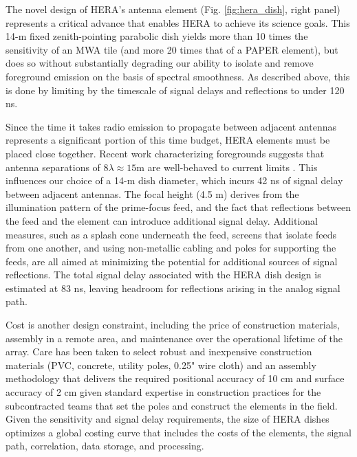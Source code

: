 \documentclass[preprint]{aastex}
\newcommand{\Mycitep}[1]{{\bf \citep{#1}}}
\begin{document}
The novel design of HERA's antenna element
(Fig. \ref{fig:hera_dish}, right panel) represents a critical advance
that enables HERA to achieve its science goals.  This 14-m
fixed zenith-pointing parabolic dish yields more than 10 times the
sensitivity of an MWA tile (and more 20 times
that of a PAPER element), but does so without substantially degrading
our ability to isolate and remove foreground emission on the basis of
spectral smoothness.  As described above, this is done by limiting by 
the timescale of signal delays and reflections to under 120 ns.

Since the time it takes radio emission to propagate between adjacent antennas 
represents a significant portion of this time budget, HERA elements must be placed close together.
Recent work characterizing foregrounds suggests that 
antenna separations of $8\lambda \approx 15$m are
well-behaved to current limits \Mycitep{pober_et_al2013,parsons_et_al2013}. This influences our
choice of a 14-m dish diameter,
which incurs 42 ns of signal delay between adjacent antennas.
The focal height (4.5 m) derives from the illumination pattern of the prime-focus
feed, and the fact that reflections
between the feed and the element%
can introduce additional signal delay. 
Additional measures, such as a splash cone underneath the feed, screens that isolate feeds from one another, and using
non-metallic cabling and poles for supporting the feeds, are all aimed at minimizing
the potential for additional sources of signal reflections.
The total signal delay associated with the HERA dish design is estimated at 83 ns, leaving
headroom for reflections arising in the analog signal path.

Cost is another design constraint, including the price of construction
materials, assembly in a remote area, and maintenance over the operational
lifetime of the array.  Care has been taken to select robust and inexpensive
construction materials (PVC, concrete, utility poles, 0.25" wire cloth) and an assembly methodology that delivers the required positional
accuracy of 10 cm and surface accuracy of 2 cm given standard expertise in construction
practices for the subcontracted teams that set the poles and construct the
elements in the field.  
Given the sensitivity and signal delay requirements, the size of HERA
dishes optimizes a global costing curve that includes the costs of the elements,
the signal path, correlation, data storage, and processing.
\end{document}
